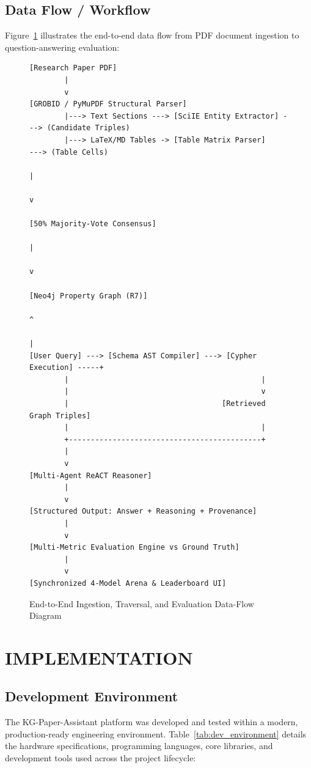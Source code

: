 \documentclass[12pt,a4paper,oneside]{report}
\begin{document}
\section{Data Flow / Workflow}
Figure~\ref{fig:workflow_diagram} illustrates the end-to-end data flow from PDF document ingestion to question-answering evaluation:
\begin{figure}[h]
\centering
\begin{verbatim}
[Research Paper PDF]
        |
        v
[GROBID / PyMuPDF Structural Parser] 
        |---> Text Sections ---> [SciIE Entity Extractor] ---> (Candidate Triples)
        |---> LaTeX/MD Tables -> [Table Matrix Parser]     ---> (Table Cells)
                                                                     |
                                                                     v
                                                          [50% Majority-Vote Consensus]
                                                                     |
                                                                     v
                                                          [Neo4j Property Graph (R7)]
                                                                     ^
                                                                     |
[User Query] ---> [Schema AST Compiler] ---> [Cypher Execution] -----+
        |                                            |
        |                                            v
        |                                   [Retrieved Graph Triples]
        |                                            |
        +--------------------------------------------+
        |
        v
[Multi-Agent ReACT Reasoner]
        |
        v
[Structured Output: Answer + Reasoning + Provenance]
        |
        v
[Multi-Metric Evaluation Engine vs Ground Truth]
        |
        v
[Synchronized 4-Model Arena & Leaderboard UI]
\end{verbatim}
\caption{End-to-End Ingestion, Traversal, and Evaluation Data-Flow Diagram}
\label{fig:workflow_diagram}
\end{figure}




\chapter{IMPLEMENTATION}

\section{Development Environment}
The KG-Paper-Assistant platform was developed and tested within a modern, production-ready engineering environment. Table~\ref{tab:dev_environment} details the hardware specifications, programming languages, core libraries, and development tools used across the project lifecycle:
\end{document}
